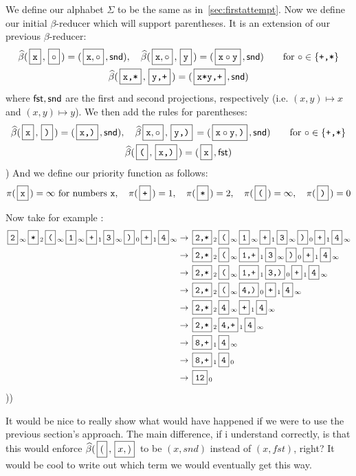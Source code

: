 \documentclass{llncs}
\newcommand{\yoni}[1]{{\begin{mdframed}[linecolor=red]{\color{red}#1}\end{mdframed}}}
\begin{document}
\begin{example}

    We define our alphabet $\Sigma$ to be the same as in~\ref{sec:firstattempt}.
    Now we define our initial $\beta$-reducer which will support parentheses.
    It is an extension of our previous $\beta$-reducer:
    \begin{gather*}
        \hb(\mbt x,\mb\circ) = (\mb{\ttt x,\circ},\snd),\quad \hb(\mb{\ttt x,\circ},\mbt y) = (\mb{\ttt x\circ\ttt y},\snd) \qquad \hbox{for $\circ\in\set{\ttt{+,*}}$} \\
        \hb(\mbt{x,*},\mbt{y,+}) = (\mbt{x*y,+},\snd)
    \end{gather*}
    where $\mathsf{fst},\mathsf{snd}$ are the first and second projections, respectively (i.e. $(x,y)\mapsto x$ and $(x,y)\mapsto y$).
    We then add the rules for parentheses:
    \begin{gather*}
        \hb(\mbt x,\mbt)) = (\mbt{x,)},\snd),\quad \hb{\mb{\ttt x,\circ},\mbt{y,)}} = (\mb{\ttt x\circ\ttt y,\ttt)},\snd) \qquad \hbox{for $\circ\in\set{\ttt{+,*}}$} \\
        \hb(\mbt(,\mbt{x,)}) = (\mbt x,\fst)
    \end{gather*}
    \gobble) %
    And we define our priority function as follows:
    \[ \pi(\mbt x) = \infty\hbox{ for numbers \ttt x},\quad \pi(\mbt+) = 1,\quad \pi(\mbt*) = 2,\quad \pi(\mbt() = \infty,\quad \pi(\mbt)) = 0 \]
    
    Now take for example :
    \begin{align*}
        \mbt2_\oo \mbt*_2 \mbt(_\oo \mbt1_\oo \mbt+_1 \mbt3_\oo \mbt)_0 \mbt+_1 \mbt4_\oo &\to \mbt{2,*}_2 \mbt(_\oo \mbt1_\oo \mbt+_1 \mbt3_\oo \mbt)_0 \mbt+_1 \mbt4_\oo\\
            &\to \mbt{2,*}_2 \mbt(_\oo \mbt{1,+}_1 \mbt3_\oo \mbt)_0\mbt+_1 \mbt4_\oo\\
            &\to \mbt{2,*}_2 \mbt(_\oo \mbt{1,+}_1 \mbt{3,)}_0 \mbt+_1 \mbt4_\oo\\
            &\to \mbt{2,*}_2 \mbt(_\oo \mbt{4,)}_0 \mbt+_1 \mbt4_\oo\\
            &\to \mbt{2,*}_2 \mbt4_\oo \mbt+_1 \mbt4_\oo\\
            &\to \mbt{2,*}_2 \mbt{4,+}_1 \mbt4_\oo\\
            &\to \mbt{8,+}_1 \mbt4_\oo\\
            &\to \mbt{8,+}_1 \mbt4_0\\
            &\to \mbt{12}_0
    \end{align*}
    \gobble)\gobble)

\yoni{It would be nice to really show what would have happened if we were to use the previous section's approach. The main difference, if i understand correctly, is that this would enforce $\hb(\mb (, \mb{x,)}$ to be $(x,snd)$ instead of $(x,fst)$, right? It would be cool to write out which term we would eventually get this way.}

\end{example}
\end{document}
